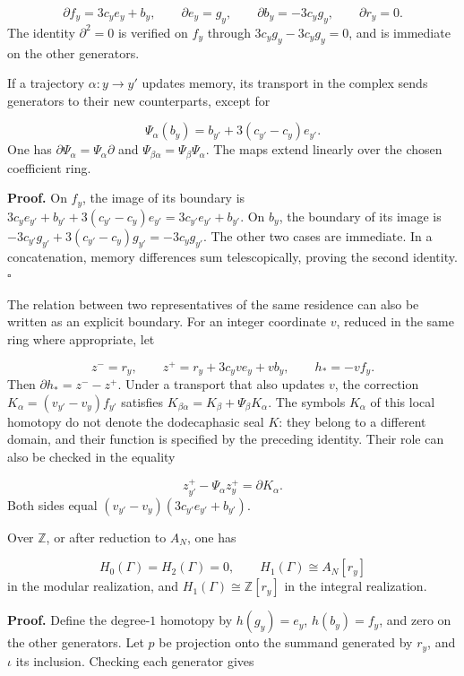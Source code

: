 \[
\partial f_y=3c_y e_y+b_y,\qquad
\partial e_y=g_y,\qquad
\partial b_y=-3c_y g_y,\qquad
\partial r_y=0.
\]
The identity \(\partial^2=0\) is verified on \(f_y\) through \(3c_yg_y-3c_yg_y=0\), and is immediate on the other generators.

If a trajectory \(\alpha:y\to y'\) updates memory, its transport in the complex sends generators to their new counterparts, except for

\[
\Psi_\alpha(b_y)=b_{y'}+3(c_{y'}-c_y)e_{y'}.
\]
One has \(\partial\Psi_\alpha=\Psi_\alpha\partial\) and \(\Psi_{\beta\alpha}=\Psi_\beta\Psi_\alpha\). The maps extend linearly over the chosen coefficient ring.

\textbf{Proof.} On \(f_y\), the image of its boundary is \(3c_ye_{y'}+b_{y'}+3(c_{y'}-c_y)e_{y'} =3c_{y'}e_{y'}+b_{y'}\). On \(b_y\), the boundary of its image is \(-3c_{y'}g_{y'}+3(c_{y'}-c_y)g_{y'}=-3c_yg_{y'}\). The other two cases are immediate. In a concatenation, memory differences sum telescopically, proving the second identity. \hfill\(\square\)

The relation between two representatives of the same residence can also be written as an explicit boundary. For an integer coordinate \(v\), reduced in the same ring where appropriate, let

\[
z^-=r_y,\qquad z^+=r_y+3c_yv e_y+v b_y,
\qquad h_*=-vf_y.
\]
Then \(\partial h_*=z^--z^+\). Under a transport that also updates \(v\), the correction \(K_\alpha=(v_{y'}-v_y)f_{y'}\) satisfies \(K_{\beta\alpha}=K_\beta+\Psi_\beta K_\alpha\). The symbols \(K_\alpha\) of this local homotopy do not denote the dodecaphasic seal \(K\): they belong to a different domain, and their function is specified by the preceding identity. Their role can also be checked in the equality

\[
z^+_{y'}-\Psi_\alpha z^+_y=\partial K_\alpha.
\]
Both sides equal \((v_{y'}-v_y)(3c_{y'}e_{y'}+b_{y'})\).

Over \(\mathbb Z\), or after reduction to \(A_N\), one has

\[
H_0(\Gamma)=H_2(\Gamma)=0,
\qquad H_1(\Gamma)\cong A_N[r_y]
\]
in the modular realization, and \(H_1(\Gamma)\cong\mathbb Z[r_y]\) in the integral realization.

\textbf{Proof.} Define the degree-\(1\) homotopy by \(h(g_y)=e_y\), \(h(b_y)=f_y\), and zero on the other generators. Let \(p\) be projection onto the summand generated by \(r_y\), and \(\iota\) its inclusion. Checking each generator gives

